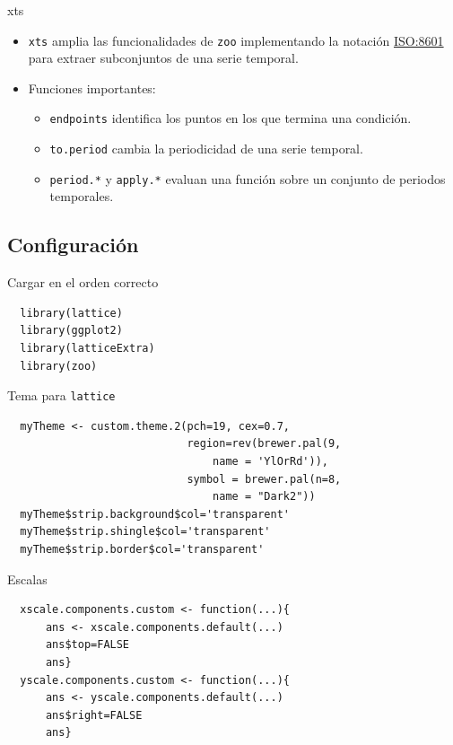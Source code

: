 \documentclass[xcolor={usenames,svgnames,dvipsnames}]{beamer}
\begin{document}
\begin{frame}[fragile,label=sec-1-1-5]{xts}
 \begin{itemize}
\item \texttt{xts} amplia las funcionalidades de \texttt{zoo} implementando la notación
\href{http://en.wikipedia.org/wiki/ISO_8601}{ISO:8601} para extraer subconjuntos de una serie temporal.
\item Funciones importantes:
\begin{itemize}
\item \texttt{endpoints} identifica los puntos en los que termina una condición.
\item \texttt{to.period} cambia la periodicidad de una serie temporal.
\item \texttt{period.*} y \texttt{apply.*} evaluan una función sobre un conjunto de
periodos temporales.
\end{itemize}
\end{itemize}
\end{frame}

\subsection{Configuración}
\label{sec-1-2}
\begin{frame}[fragile,label=sec-1-2-1]{Cargar en el orden correcto}
 \lstset{language=R,label= ,caption= ,numbers=none}
\begin{lstlisting}
  library(lattice)
  library(ggplot2)
  library(latticeExtra)
  library(zoo)
\end{lstlisting}
\end{frame}
\begin{frame}[fragile,label=sec-1-2-2]{Tema para \texttt{lattice}}
 \lstset{language=R,label= ,caption= ,numbers=none}
\begin{lstlisting}
  myTheme <- custom.theme.2(pch=19, cex=0.7,
                            region=rev(brewer.pal(9,
                                name = 'YlOrRd')),
                            symbol = brewer.pal(n=8,
                                name = "Dark2"))
  myTheme$strip.background$col='transparent'
  myTheme$strip.shingle$col='transparent'
  myTheme$strip.border$col='transparent'
\end{lstlisting}
\end{frame}

\begin{frame}[fragile,label=sec-1-2-3]{Escalas}
 \lstset{language=R,label= ,caption= ,numbers=none}
\begin{lstlisting}
  xscale.components.custom <- function(...){
      ans <- xscale.components.default(...)
      ans$top=FALSE
      ans}
  yscale.components.custom <- function(...){
      ans <- yscale.components.default(...)
      ans$right=FALSE
      ans}
\end{lstlisting}
\end{frame}
\end{document}
